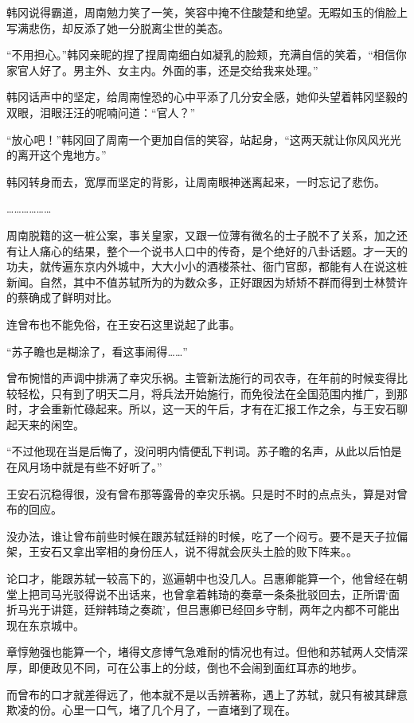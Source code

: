 韩冈说得霸道，周南勉力笑了一笑，笑容中掩不住酸楚和绝望。无暇如玉的俏脸上写满悲伤，却反添了她一分脱离尘世的美态。

“不用担心。”韩冈亲昵的捏了捏周南细白如凝乳的脸颊，充满自信的笑着，“相信你家官人好了。男主外、女主内。外面的事，还是交给我来处理。”

韩冈话声中的坚定，给周南惶恐的心中平添了几分安全感，她仰头望着韩冈坚毅的双眼，泪眼汪汪的呢喃问道：“官人？”

“放心吧！”韩冈回了周南一个更加自信的笑容，站起身，“这两天就让你风风光光的离开这个鬼地方。”

韩冈转身而去，宽厚而坚定的背影，让周南眼神迷离起来，一时忘记了悲伤。

………………

周南脱籍的这一桩公案，事关皇家，又跟一位薄有微名的士子脱不了关系，加之还有让人痛心的结果，整个一个说书人口中的传奇，是个绝好的八卦话题。才一天的功夫，就传遍东京内外城中，大大小小的酒楼茶社、衙门官邸，都能有人在说这桩新闻。自然，其中不值苏轼所为的为数众多，正好跟因为矫矫不群而得到士林赞许的蔡确成了鲜明对比。

连曾布也不能免俗，在王安石这里说起了此事。

“苏子瞻也是糊涂了，看这事闹得……”

曾布惋惜的声调中排满了幸灾乐祸。主管新法施行的司农寺，在年前的时候变得比较轻松，只有到了明天二月，将兵法开始施行，而免役法在全国范围内推广，到那时，才会重新忙碌起来。所以，这一天的午后，才有在汇报工作之余，与王安石聊起天来的闲空。

“不过他现在当是后悔了，没问明内情便乱下判词。苏子瞻的名声，从此以后怕是在风月场中就是有些不好听了。”

王安石沉稳得很，没有曾布那等露骨的幸灾乐祸。只是时不时的点点头，算是对曾布的回应。

没办法，谁让曾布前些时候在跟苏轼廷辩的时候，吃了一个闷亏。要不是天子拉偏架，王安石又拿出宰相的身份压人，说不得就会灰头土脸的败下阵来。。

论口才，能跟苏轼一较高下的，巡遍朝中也没几人。吕惠卿能算一个，他曾经在朝堂上把司马光驳得说不出话来，也曾拿着韩琦的奏章一条条批驳回去，正所谓‘面折马光于讲筵，廷辩韩琦之奏疏’，但吕惠卿已经回乡守制，两年之内都不可能出现在东京城中。

章惇勉强也能算一个，堵得文彦博气急难耐的情况也有过。但他和苏轼两人交情深厚，即便政见不同，可在公事上的分歧，倒也不会闹到面红耳赤的地步。

而曾布的口才就差得远了，他本就不是以舌辨著称，遇上了苏轼，就只有被其肆意欺凌的份。心里一口气，堵了几个月了，一直堵到了现在。

